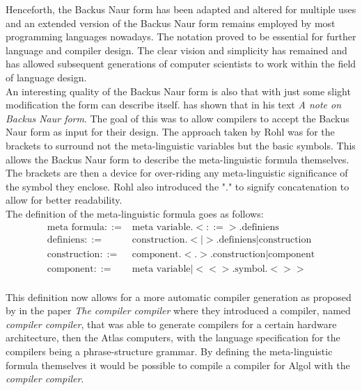 \documentclass{article}
\begin{document}
Henceforth, the Backus Naur form has been adapted and altered for multiple uses and an extended version of the Backus Naur form remains employed by most programming languages nowadays. The notation proved to be essential for further language and compiler design. The clear vision and simplicity has remained and has allowed subsequent generations of computer scientists to work within the field of language design.
\\
An interesting quality of the Backus Naur form is also that with just some slight modification the form can describe itself. \citet{rohl1968note} has shown that in his text \textit{A note on Backus Naur form}. The goal of this was to allow compilers to accept the Backus Naur form as input for their design. The approach taken by Rohl was for the brackets to surround not the meta-linguistic variables but the basic symbols. This allows the Backus Naur form to describe the meta-linguistic formula themselves. The brackets are then a device for over-riding any meta-linguistic significance of the symbol they enclose. Rohl also introduced the "$.$" to signify concatenation to allow for better readability.
\\
The definition of the meta-linguistic formula goes as follows:
\begin{equation} \label{eq4}
\begin{split}
	\text{meta formula} ::=& \text{meta variable}.<::=>.\text{definiens} \\
	\text{definiens} ::=& \text{construction}.<|>.\text{definiens} | \text{construction} \\
	\text{construction} ::=& \text{component}.<.>.\text{construction} | \text{component} \\
	\text{component} ::=& \text{meta variable} | <<>.\text{symbol}.<>> \\
\end{split}
\end{equation}

This definition now allows for a more automatic compiler generation as proposed by \citet{brooker1963compiler} in the paper \textit{The compiler compiler} where they introduced a compiler, named \textit{compiler compiler}, that was able to generate compilers for a certain hardware architecture, then the Atlas computers, with the language specification for the compilers being a phrase-structure grammar. By defining the meta-linguistic formula themselves it would be possible to compile a compiler for Algol with the \textit{compiler compiler}.
\end{document}
